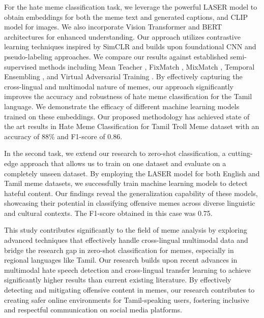 \documentclass{ieeeaccess}
\begin{document}
For the hate meme classification task, we leverage the powerful LASER model to obtain embeddings for both the meme text and generated captions, and CLIP \cite{b12} model for images. We also incorporate Vision Transformer \cite{b13} and BERT \cite{b14} architectures for enhanced understanding. Our approach utilizes contrastive learning techniques inspired by SimCLR \cite{b15} and builds upon foundational CNN \cite{b16,b17} and pseudo-labeling \cite{b18} approaches. We compare our results against established semi-supervised methods including Mean Teacher \cite{b19}, FixMatch \cite{b20}, MixMatch \cite{b21}, Temporal Ensembling \cite{b22}, and Virtual Adversarial Training \cite{b23}. By effectively capturing the cross-lingual and multimodal nature of memes, our approach significantly improves the accuracy and robustness of hate meme classification for the Tamil language. We demonstrate the efficacy of different machine learning models trained on these embeddings. Our proposed methodology has achieved state of the art results in Hate Meme Classification for Tamil Troll Meme dataset with an accuracy of 88\% and F1-score of 0.86.

In the second task, we extend our research to zero-shot classification, a cutting-edge approach that allows us to train on one dataset and evaluate on a completely unseen dataset. By employing the LASER model for both English and Tamil meme datasets, we successfully train machine learning models to detect hateful content. Our findings reveal the generalization capability of these models, showcasing their potential in classifying offensive memes across diverse linguistic and cultural contexts. The F1-score obtained in this case was 0.75.

This study contributes significantly to the field of meme analysis by exploring advanced techniques that effectively handle cross-lingual multimodal data and bridge the research gap in zero-shot classification for memes, especially in regional languages like Tamil. Our research builds upon recent advances in multimodal hate speech detection \cite{b24} and cross-lingual transfer learning \cite{b25} to achieve significantly higher results than current existing literature. By effectively detecting and mitigating offensive content in memes, our research contributes to creating safer online environments for Tamil-speaking users, fostering inclusive and respectful communication on social media platforms.
\end{document}
